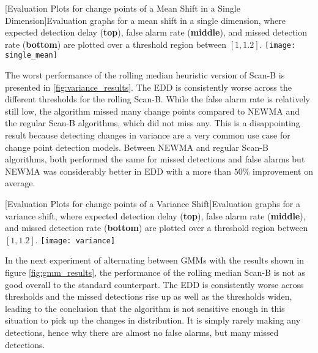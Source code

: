 \begin{minipage}{\textwidth}
\begin{center} 
[Evaluation Plots for change points of a Mean Shift in a Single Dimension]{Evaluation graphs for a mean shift in a single dimension, where expected detection delay (\textbf{top}), false alarm rate (\textbf{middle}), and missed detection rate (\textbf{bottom}) are plotted over a threshold region between $[1,1.2]$. } 
\texttt{[image: single\_mean]} 
\label{fig:single_mean_results} 
\end{center}
\end{minipage}

The worst performance of the rolling median heuristic version of Scan-B is presented in \ref{fig:variance_results}. The EDD is consistently worse across the different thresholds for the rolling Scan-B. While the false alarm rate is relatively still low, the algorithm missed many change points compared to NEWMA and the regular Scan-B algorithms, which did not miss any. This is a disappointing result because detecting changes in variance are a very common use case for change point detection models. Between NEWMA and regular Scan-B algorithms, both performed the same for missed detections and false alarms but NEWMA was considerably better in EDD with a more than $50\%$ improvement on average.

\begin{minipage}{\textwidth}
\begin{center} 
[Evaluation Plots for change points of a Variance Shift]{Evaluation graphs for a variance shift, where expected detection delay (\textbf{top}), false alarm rate (\textbf{middle}), and missed detection rate (\textbf{bottom}) are plotted over a threshold region between $[1,1.2]$. } 
\texttt{[image: variance]} 
\label{fig:variance_results} 
\end{center}
\end{minipage}

In the next experiment of alternating between GMMs with the results shown in figure \ref{fig:gmm_results}, the performance of the rolling median Scan-B is not as good overall to the standard counterpart. The EDD is consistently worse across thresholds and the missed detections rise up as well as the thresholds widen, leading to the conclusion that the algorithm is not sensitive enough in this situation to pick up the changes in distribution. It is simply rarely making any detections, hence why there are almost no false alarms, but many missed detections.

